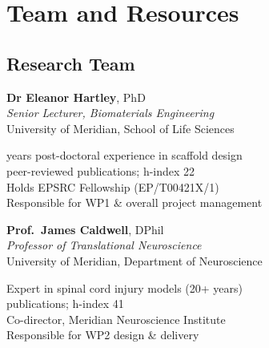 \documentclass[11pt,a4paper]{article}
\newcommand{\pinkbullet}{\textcolor{ukripink}{\textbullet}\enspace}
\begin{document}
\section{Team and Resources}

\subsection{Research Team}

\vspace{4pt}

\begin{minipage}[t]{0.48\textwidth}
\begin{tcolorbox}[sectionbox, title=Lead Applicant]
\textbf{Dr Eleanor Hartley}, PhD\\
\textit{Senior Lecturer, Biomaterials Engineering}\\
University of Meridian, School of Life Sciences

\vspace{4pt}
\pinkbullet 12 years post-doctoral experience in scaffold design\\
\pinkbullet 45 peer-reviewed publications; h-index 22\\
\pinkbullet Holds EPSRC Fellowship (EP/T00421X/1)\\
\pinkbullet Responsible for WP1 \& overall project management
\end{tcolorbox}
\end{minipage}%
\hfill
\begin{minipage}[t]{0.48\textwidth}
\begin{tcolorbox}[sectionbox, title=Co-Investigator]
\textbf{Prof.\ James Caldwell}, DPhil\\
\textit{Professor of Translational Neuroscience}\\
University of Meridian, Department of Neuroscience

\vspace{4pt}
\pinkbullet Expert in spinal cord injury models (20+ years)\\
\pinkbullet 97 publications; h-index 41\\
\pinkbullet Co-director, Meridian Neuroscience Institute\\
\pinkbullet Responsible for WP2 design \& delivery
\end{tcolorbox}
\end{minipage}

\par
\vspace{6pt}
\end{document}
